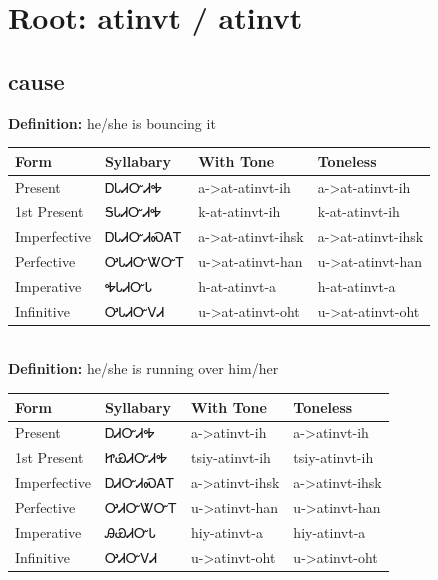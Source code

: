 \documentclass{article}%
\begin{document}
%
\normalsize%
\section*{Root: atinvt / atinvt}%
\subsection*{cause}%
\textbf{Definition: }%
he/she is bouncing it%
\\[0.5em]%
\begin{tabular}{|l|l|l|l|}%
\hline%
\textbf{Form}&\textbf{Syllabary}&\textbf{With Tone}&\textbf{Toneless}\\%
\hline%
Present&ᎠᏓᏗᏅᏗᎭ&a{-}>at{-}atinvt{-}ih&a{-}>at{-}atinvt{-}ih\\%
1st Present&ᎦᏓᏗᏅᏗᎭ&k{-}at{-}atinvt{-}ih&k{-}at{-}atinvt{-}ih\\%
Imperfective&ᎠᏓᏗᏅᏗᏍᎪᎢ&a{-}>at{-}atinvt{-}ihsk&a{-}>at{-}atinvt{-}ihsk\\%
Perfective&ᎤᏓᏗᏅᏔᏅᎢ&u{-}>at{-}atinvt{-}han&u{-}>at{-}atinvt{-}han\\%
Imperative&ᎭᏓᏗᏅᏓ&h{-}at{-}atinvt{-}a&h{-}at{-}atinvt{-}a\\%
Infinitive&ᎤᏓᏗᏅᏙᏗ&u{-}>at{-}atinvt{-}oht&u{-}>at{-}atinvt{-}oht\\%
\hline%
\end{tabular}%
\\[1em]%
\textbf{Definition: }%
he/she is running over him/her%
\\[0.5em]%
\begin{tabular}{|l|l|l|l|}%
\hline%
\textbf{Form}&\textbf{Syllabary}&\textbf{With Tone}&\textbf{Toneless}\\%
\hline%
Present&ᎠᏗᏅᏗᎭ&a{-}>atinvt{-}ih&a{-}>atinvt{-}ih\\%
1st Present&ᏥᏯᏗᏅᏗᎭ&tsiy{-}atinvt{-}ih&tsiy{-}atinvt{-}ih\\%
Imperfective&ᎠᏗᏅᏗᏍᎪᎢ&a{-}>atinvt{-}ihsk&a{-}>atinvt{-}ihsk\\%
Perfective&ᎤᏗᏅᏔᏅᎢ&u{-}>atinvt{-}han&u{-}>atinvt{-}han\\%
Imperative&ᎯᏯᏗᏅᏓ&hiy{-}atinvt{-}a&hiy{-}atinvt{-}a\\%
Infinitive&ᎤᏗᏅᏙᏗ&u{-}>atinvt{-}oht&u{-}>atinvt{-}oht\\%
\hline%
\end{tabular}%
\\[1em]%
\end{document}
